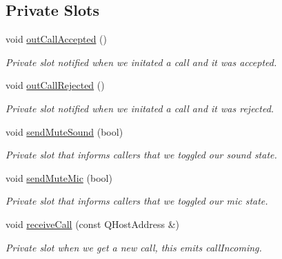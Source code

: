 \subsection*{\-Private \-Slots}
\begin{DoxyCompactItemize}
\item 
void \hyperlink{class_state_controller_aeb2b0fefa23d2b8387bdbdfcfb8816d5}{out\-Call\-Accepted} ()
\begin{DoxyCompactList}\small\item\em \-Private slot notified when we initated a call and it was accepted. \end{DoxyCompactList}\item 
void \hyperlink{class_state_controller_af2cf71817cfee97b30522d2467189986}{out\-Call\-Rejected} ()
\begin{DoxyCompactList}\small\item\em \-Private slot notified when we initated a call and it was rejected. \end{DoxyCompactList}\item 
void \hyperlink{class_state_controller_afad096da5239c061e50f11e3305330c2}{send\-Mute\-Sound} (bool)
\begin{DoxyCompactList}\small\item\em \-Private slot that informs callers that we toggled our sound state. \end{DoxyCompactList}\item 
void \hyperlink{class_state_controller_acd581d4d2d27a34792b65df142316a7f}{send\-Mute\-Mic} (bool)
\begin{DoxyCompactList}\small\item\em \-Private slot that informs callers that we toggled our mic state. \end{DoxyCompactList}\item 
void \hyperlink{class_state_controller_a4fe638c4abe79196464688dd148e28dc}{receive\-Call} (const \-Q\-Host\-Address \&)
\begin{DoxyCompactList}\small\item\em \-Private slot when we get a new call, this emits call\-Incoming. \end{DoxyCompactList}\end{DoxyCompactItemize}
